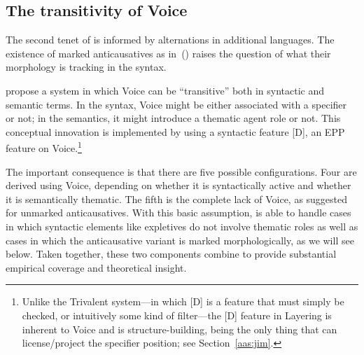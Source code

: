 \begin{exe}
\begin{xlist}
\begin{exe}
\begin{exe}
\begin{xlist}
	\subsection{The transitivity of Voice} \label{aas:layering:features}
The second tenet of  is informed by alternations in additional languages. The existence of marked anticausatives as in~(\nextx) raises the question of what their morphology is tracking in the syntax.
 \begin{exe}
	
 \z 

\cite{layering15} propose a system in which Voice can be ``transitive'' both in syntactic and semantic terms. In the syntax, Voice might be either associated with a specifier or not; in the semantics, it might introduce a thematic agent role or not. This conceptual innovation is implemented by using a syntactic feature [D], an EPP feature on Voice.\footnote{Unlike the Trivalent system---in which [D] is a feature that must simply be checked, or intuitively some kind of filter---the [D] feature in Layering is inherent to Voice and is structure-building, being the only thing that can license/project the specifier position; see Section~\ref{aas:jim}.}

The important consequence is that there are five possible configurations. Four are derived using Voice, depending on whether it is syntactically active and whether it is semantically thematic. The fifth is the complete lack of Voice, as suggested for unmarked anticausatives. With this basic assumption,  is able to handle cases in which syntactic elements like expletives do not involve thematic roles as well as cases in which the anticausative variant is marked morphologically, as we will see below. Taken together, these two components combine to provide substantial empirical coverage and theoretical insight.


\end{exe}
\end{xlist}
\end{exe}
\end{exe}
\end{xlist}
\end{exe}
